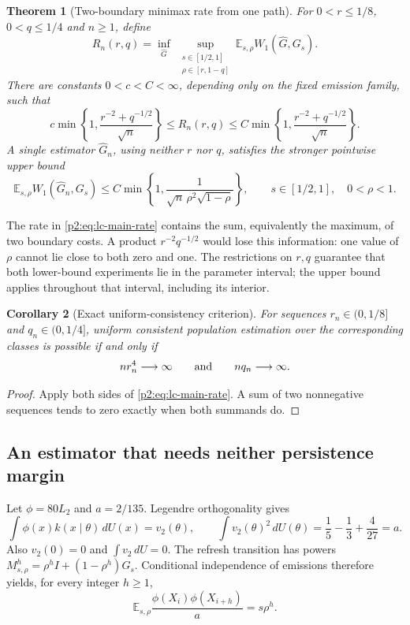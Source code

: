 \documentclass[11pt,a4paper]{article}
\newtheorem{theorem}{Theorem}[section]
\newtheorem{corollary}[theorem]{Corollary}
\theoremstyle{definition}
\theoremstyle{remark}
\numberwithin{equation}{section}
\begin{document}
\begin{theorem}[Two-boundary minimax rate from one path]
\label{p2:thm:lc-main}
For $0<r\le1/8$, $0<q\le1/4$ and $n\ge1$, define
\[
 R_n(r,q)=\inf_{\widehat G}\ 
 \sup_{\substack{s\in[1/2,1]\\\rho\in[r,1-q]}}
 \mathbb E_{s,\rho}W_1(\widehat G,G_s).
\]
There are constants $0<c<C<\infty$, depending only on the fixed emission
family, such that
\begin{equation}\label{p2:eq:lc-main-rate}
 c\min\left\{1,\frac{r^{-2}+q^{-1/2}}{\sqrt n}\right\}
 \le R_n(r,q)\le
 C\min\left\{1,\frac{r^{-2}+q^{-1/2}}{\sqrt n}\right\}.
\end{equation}
A single estimator $\widehat G_n$, using neither $r$ nor $q$, satisfies the
stronger pointwise upper bound
\begin{equation}\label{p2:eq:lc-pointwise}
 \mathbb E_{s,\rho}W_1(\widehat G_n,G_s)
 \le C\min\left\{1,\frac1{\sqrt n\,\rho^2\sqrt{1-\rho}}\right\},
 \qquad s\in[1/2,1],\quad 0<\rho<1.
\end{equation}
\end{theorem}

The rate in \eqref{p2:eq:lc-main-rate} contains the sum, equivalently the maximum,
of two boundary costs.  A product $r^{-2}q^{-1/2}$ would lose this information:
one value of $\rho$ cannot lie close to both zero and one.  The restrictions on
$r,q$ guarantee that both lower-bound experiments lie in the parameter
interval; the upper bound applies throughout that interval, including its
interior.

\begin{corollary}[Exact uniform-consistency criterion]
\label{p2:cor:lc-consistency}
For sequences $r_n\in(0,1/8]$ and $q_n\in(0,1/4]$, uniform consistent
population estimation over the corresponding classes is possible if and only if
\[
 nr_n^4\longrightarrow\infty
 \qquad\hbox{and}\qquad nq_n\longrightarrow\infty.
\]
\end{corollary}
\begin{proof}
Apply both sides of \eqref{p2:eq:lc-main-rate}.  A sum of two nonnegative
sequences tends to zero exactly when both summands do.
\end{proof}

\subsection{An estimator that needs neither persistence margin}

Let $\phi=80L_2$ and $a=2/135$.  Legendre orthogonality gives
\[
 \int \phi(x)k(x\mid\theta)\,dU(x)=v_2(\theta),
 \qquad \int v_2(\theta)^2\,dU(\theta)
 =\frac15-\frac13+\frac4{27}=a.
\]
Also $v_2(0)=0$ and $\int v_2\,dU=0$.  The refresh transition has powers
$M_{s,\rho}^h=\rho^h I+(1-\rho^h)G_s$.  Conditional independence of
emissions therefore yields, for every integer $h\ge1$,
\begin{equation}\label{p2:eq:lc-moments}
 \mathbb E_{s,\rho}
    \frac{\phi(X_i)\phi(X_{i+h})}{a}=s\rho^h.
\end{equation}
\end{document}
